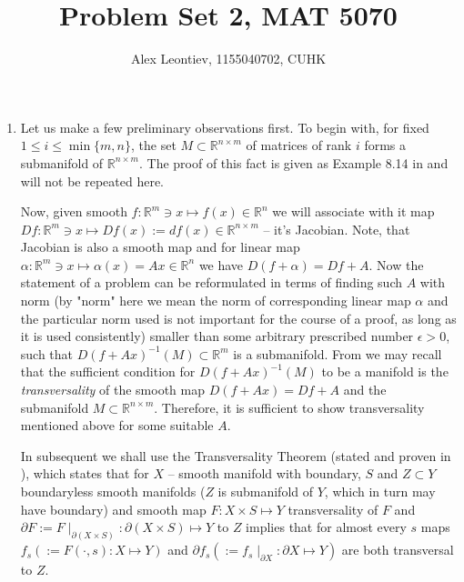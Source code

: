 \documentclass[8pt]{article} %
\title{Problem Set 2, MAT 5070}
\author{Alex Leontiev, 1155040702, CUHK}
\begin{document}
\maketitle
\begin{enumerate}[label=\bfseries \arabic*.]
	\item{Let us make a few preliminary observations first. To begin with, for fixed $1\leq i\leq \min\{m,n\}$, the set $M\subset \mathbb{R}^{n\times m}$
		of matrices of rank $i$ forms a submanifold of $\mathbb{R}^{n\times m}$. The proof of this fact is given as Example 8.14 in
		\cite{lee} and will not be repeated here.

		Now, given smooth $f:\mathbb{R}^m\ni x\mapsto f(x)\in\mathbb{R}^n$ we will associate with it map $Df:\mathbb{R}^m\ni x\mapsto
		Df(x):=df(x)\in\mathbb{R}^{n\times m}$ -- it's Jacobian. Note, that Jacobian is also a smooth map and for linear map $\alpha:\mathbb{R}^m\ni x\mapsto
		\alpha(x)=Ax\in\mathbb{R}^n$ we have $D(f+\alpha)=Df+A$. Now the statement of a problem can be reformulated in terms of finding such $A$ with
		norm (by "norm" here we mean the norm of corresponding linear map $\alpha$ and the particular norm used is not important for the course of a proof,
		as long as it is used consistently)
		smaller than some arbitrary prescribed number $\epsilon>0$, such that $D(f+Ax)^{-1}(M)\subset\mathbb{R}^m$ is a submanifold. From
		\cite{gp} we may recall that the sufficient condition for $D(f+Ax)^{-1}(M)$ to be a manifold is the {\it transversality} of the smooth map $D(f+Ax)=
		Df+A$
		and the submanifold $M\subset\mathbb{R}^{n\times m}$. Therefore, it is sufficient to show transversality mentioned above for some suitable $A$.
		
		In subsequent we shall use the Transversality Theorem (stated and proven in \cite[Chapter 2,\S 3]{gp}), which states that for $X$ --
		smooth manifold with boundary, $S$ and $Z\subset Y$ boundaryless smooth manifolds ($Z$ is submanifold of $Y$, which in turn
		may have boundary) and smooth map $F:X\times S\mapsto Y$ transversality of $F$ and $\partial F:=F\mid_{\partial(X
		\times S)}:\partial(X\times S)\mapsto Y$ to $Z$ implies that for almost every $s$ maps $f_s(:=F(\cdot,s):X\mapsto Y)$ and 
		$\partial f_s(:=f_s\mid_{\partial X}:\partial X\mapsto Y)$ are both transversal to $Z$.

}
\end{enumerate}
\end{document}
